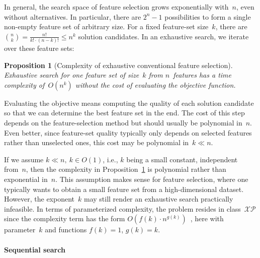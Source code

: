 \documentclass{article}
\newtheorem{proposition}{Proposition}
\theoremstyle{definition}
\begin{document}
In general, the search space of feature selection grows exponentially with~$n$, even without alternatives.
In particular, there are $2^n - 1$ possibilities to form a single non-empty feature set of arbitrary size.
For a fixed feature-set size~$k$, there are $\binom{n}{k} = \frac{n!}{k! \cdot (n-k)!} \leq n^k$ solution candidates.
In an exhaustive search, we iterate over these feature sets:
%
\begin{proposition}[Complexity of exhaustive conventional feature selection]
	Exhaustive search for one feature set of size~$k$ from $n$~features has a time complexity of~$O(n^k)$ without the cost of evaluating the objective function.
	\label{prop:afs:complexity-exhaustive-conventional}
\end{proposition}
%
Evaluating the objective means computing the quality of each solution candidate so that we can determine the best feature set in the end.
The cost of this step depends on the feature-selection method but should usually be polynomial in~$n$.
Even better, since feature-set quality typically only depends on selected features rather than unselected ones, this cost may be polynomial in~$k \ll n$.

If we assume $k \ll n,~k \in O(1)$, i.e., $k$ being a small constant, independent from~$n$, then the complexity in Proposition~\ref{prop:afs:complexity-exhaustive-conventional} is polynomial rather than exponential in~$n$.
This assumption makes sense for feature selection, where one typically wants to obtain a small feature set from a high-dimensional dataset.
However, the exponent~$k$ may still render an exhaustive search practically infeasible.
In terms of parameterized complexity, the problem resides in class~$\mathcal{XP}$ since the complexity term has the form $O(f(k) \cdot n^{g(k)})$~\cite{downey1997parameterized}, here with parameter~$k$ and functions $f(k) = 1$, $g(k) = k$.

\paragraph{Sequential search}
\end{document}
